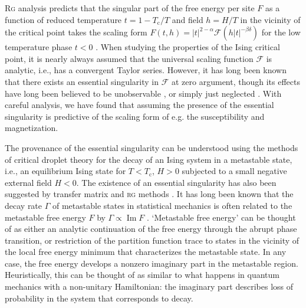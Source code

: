 \documentclass[aps,prl,reprint]{revtex4-1}
\def\im{\mathop{\mathrm{Im}}\nolimits}
\def\c{\mathrm c}
\def\fF{\mathcal F}  %
\begin{document}
\textsc{Rg} analysis predicts that the singular part of the free energy per
site $F$ as a function of reduced temperature $t=1-T_\c/T$ and field $h=H/T$
in the vicinity of the critical point takes the scaling form
$F(t,h)=|t|^{2-\alpha}\fF(h|t|^{-\beta\delta})$ for the low temperature phase
$t<0$ \cite{cardy.1996.scaling}. When studying the properties of the Ising
critical point, it is nearly always assumed that the universal scaling
function $\fF$ is analytic, i.e., has a convergent Taylor series. However, it
has long been known that there exists an essential singularity in $\fF$ at
zero argument, though its effects have long been believed to be unobservable
\cite{fisher.1967.condensation}, or simply just neglected
\cite{guida.1997.3dising,schofield.1969.parametric,schofield.1969.correlation,caselle.2001.critical,josephson.1969.equation,fisher.1999.trigonometric}.
With careful analysis, we have found that assuming the presence of the
essential singularity is predictive of the scaling form of e.g. the
susceptibility and magnetization.

The provenance of the essential singularity can be understood using the
methods of critical droplet theory for the decay of an Ising system in a
metastable state, i.e., an equilibrium Ising state for $T<T_\c$, $H>0$
subjected to a small negative external field $H<0$. The existence of an
essential singularity has also been suggested by transfer matrix
\cite{mccraw.1978.metastability,enting.1980.investigation} and \textsc{rg}
methods \cite{klein.1976.essential}.  It has long been known that the decay
rate $\Gamma$ of metastable states in statistical mechanics is often related
to the metastable free energy $F$ by $\Gamma\propto\im F$
\cite{langer.1969.metastable,penrose.1987.rigorous,gaveau.1989.analytic,privman.1982.analytic}.
`Metastable free energy' can be thought of as either an analytic continuation
of the free energy through the abrupt phase transition, or restriction of the
partition function trace to states in the vicinity of the local free energy
minimum that characterizes the metastable state. In any case, the free energy
develops a nonzero imaginary part in the metastable region. Heuristically,
this can be thought of as similar to what happens in quantum mechanics with a
non-unitary Hamiltonian: the imaginary part describes loss of probability in
the system that corresponds to decay. 
\end{document}
